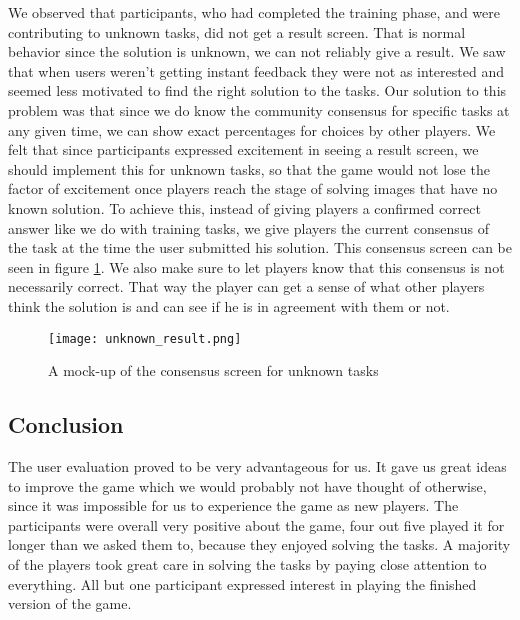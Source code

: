 We observed that participants, who had completed the training phase, and were contributing to unknown tasks, did not get a result screen. That is normal behavior since the solution is unknown, we can not reliably give a result. We saw that when users weren't getting instant feedback they were not as interested and seemed less motivated to find the right solution to the tasks. Our solution to this problem was that since we do know the community consensus for specific tasks at any given time, we can show exact percentages for choices by other players. We felt that since participants expressed excitement in seeing a result screen, we should implement this for unknown tasks, so that the game would not lose the factor of excitement once players reach the stage of solving images that have no known solution. To achieve this, instead of giving players a confirmed correct answer like we do with training tasks, we give players the current consensus of the task at the time the user submitted his solution. This consensus screen can be seen in figure \ref{fig:consensus}. We also make sure to let players know that this consensus is not necessarily correct. That way the player can get a sense of what other players think the solution is and can see if he is in agreement with them or not.

\begin{figure}[H]
	\centering
	\graphicspath{ {./graphics/} }
	\centerline{\texttt{[image: unknown\_result.png]}}
	\caption{\label{fig:consensus}A mock-up of the consensus screen for unknown tasks}
\end{figure}

\subsection{Conclusion}
	The user evaluation proved to be very advantageous for us. It gave us great ideas to improve the game which we would probably not have thought of otherwise, since it was impossible for us to experience the game as new players. The participants were overall very positive about the game, four out five played it for longer than we asked them to, because they enjoyed solving the tasks. A majority of the players took great care in solving the tasks by paying close attention to everything. All but one participant expressed interest in playing the finished version of the game.

